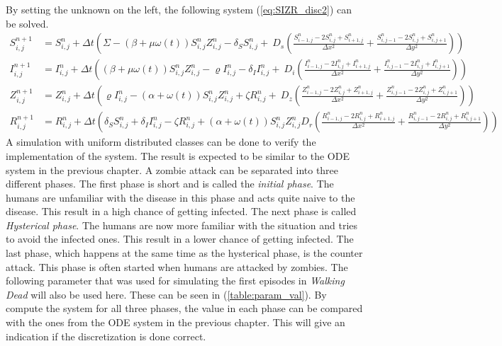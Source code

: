 \documentclass[%
twoside,                 %
final,                   %
10pt]{article}
\begin{document}
By setting the unknown on the left, the following system (\ref{eq:SIZR_disc2}) can be solved. 
\begin{equation} \label{eq:SIZR_disc2}
	\begin{aligned}
    S^{n+1}_{i,j} &= S^n_{i,j} + \Delta t \left( \Sigma - (\beta+\mu \omega(t))S^{n}_{i,j}Z^{n}_{i,j}- \delta_S S^{n}_{i,j}+\
        D_s\left(\frac{S^{n}_{i-1,j}-2S^{n}_{i,j}+S^{n}_{i+1,j}}{\Delta x^2}+\frac{S^{n}_{i,j-1}-2S^{n}_{i,j}+S^{n}_{i,j+1}}{\Delta y^2}\right)\right) \\
    I^{n+1}_{i,j} &= I^n_{i,j} + \Delta t \left((\beta+\mu \omega(t))S^{n}_{i,j}Z^{n}_{i,j}-\varrho I^{n}_{i,j}- \delta_I I^{n}_{i,j}+\
        D_i\left(\frac{I^{n}_{i-1,j}-2I^{n}_{i,j}+I^{n}_{i+1,j}}{\Delta x^2}+\frac{I^{n}_{i,j-1}-2I^{n}_{i,j}+I^{n}_{i,j+1}}{\Delta y^2}\right)\right) \\
    Z^{n+1}_{i,j} &= Z^n_{i,j} +\Delta t \left( \varrho I^{n}_{i,j}-(\alpha+\omega(t))S^{n}_{i,j}Z^{n}_{i,j}+ \zeta R^{n}_{i,j}+\
        D_z\left(\frac{Z^{n}_{i-1,j}-2Z^{n}_{i,j}+Z^{n}_{i+1,j}}{\Delta x^2}+\frac{Z^{n}_{i,j-1}-2Z^{n}_{i,j}+Z^{n}_{i,j+1}}{\Delta y^2}\right)\right) \\
    R^{n+1}_{i,j} &= R^n_{i,j} +\Delta t \left(\delta_S S^{n}_{i,j}+\delta_I I^{n}_{i,j}-\zeta R^{n}_{i,j}+(\alpha+\omega(t))S^{n}_{i,j}Z^{n}_{i,j}
        D_r\left(\frac{R^{n}_{i-1,j}-2R^{n}_{i,j}+R^{n}_{i+1,j}}{\Delta x^2}+\frac{R^{n}_{i,j-1}-2R^{n}_{i,j}+R^{n}_{i,j+1}}{\Delta y^2}\right)\right) 
	\end{aligned}
\end{equation}
A simulation with uniform distributed classes can be done to verify the implementation of the system. The result is expected to be similar to the ODE system in the previous chapter. A zombie attack can be separated into three different phases. The first phase is short and is called the \emph{initial phase}. The humans are unfamiliar with the disease in this phase and acts quite naive to the disease. This result in a high chance of getting infected. The next phase is called \emph{Hysterical phase}. The humans are now more familiar with the situation and tries to avoid the infected ones. This result in a lower chance of getting infected. The last phase, which happens at the same time as the hysterical phase, is the counter attack. This phase is often started when humans are attacked by zombies. The following parameter that was used for simulating the first episodes in \emph{Walking Dead} will also be used here. These can be seen in (\ref{table:param_val}). By compute the system for all three phases, the value in each phase can be compared with the ones from the ODE system in the previous chapter. This will give an indication if the discretization is done correct. 
\end{document}
